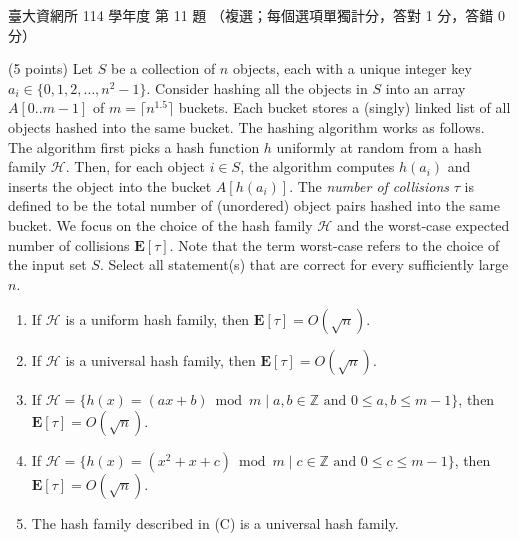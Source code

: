 \begin{pastexam}[label={px:ntu-114-dsa-11}]{臺大資網所 114 學年度 第 11 題}
（複選；每個選項單獨計分，答對 1 分，答錯 0 分）

(5 points) Let $S$ be a collection of $n$ objects, each with a unique integer key $a_i\in\{0,1,2,\ldots,n^2-1\}$.
Consider hashing all the objects in $S$ into an array $A[0..m-1]$ of $m=\lceil n^{1.5}\rceil$ buckets. Each
bucket stores a (singly) linked list of all objects hashed into the same bucket. The hashing algorithm works as
follows. The algorithm first picks a hash function $h$ uniformly at random from a hash family $\mathcal{H}$.
Then, for each object $i\in S$, the algorithm computes $h(a_i)$ and inserts the object into the bucket
$A[h(a_i)]$. The \textit{number of collisions} $\tau$ is defined to be the total number of (unordered) object
pairs hashed into the same bucket. We focus on the choice of the hash family $\mathcal{H}$ and the worst-case
expected number of collisions $\mathbf{E}[\tau]$. Note that the term worst-case refers to the choice of the
input set $S$. Select all statement(s) that are correct for every sufficiently large $n$.
\begin{enumerate}[label=(\Alph*)]
\item If $\mathcal{H}$ is a uniform hash family, then $\mathbf{E}[\tau]=O(\sqrt{n})$.
\item If $\mathcal{H}$ is a universal hash family, then $\mathbf{E}[\tau]=O(\sqrt{n})$.
\item If $\mathcal{H}=\{h(x)=(ax+b)\bmod m\mid a,b\in\mathbb{Z}\text{ and }0\le a,b\le m-1\}$, then
$\mathbf{E}[\tau]=O(\sqrt{n})$.
\item If $\mathcal{H}=\{h(x)=(x^2+x+c)\bmod m\mid c\in\mathbb{Z}\text{ and }0\le c\le m-1\}$, then
$\mathbf{E}[\tau]=O(\sqrt{n})$.
\item The hash family described in (C) is a universal hash family.
\end{enumerate}
\end{pastexam}

